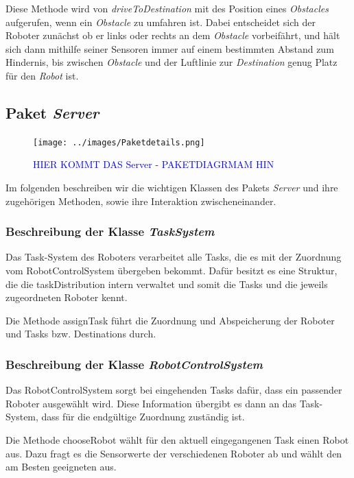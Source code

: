 			Diese Methode wird von \textit{driveToDestination} mit des Position eines \textit{Obstacles} aufgerufen, 
			wenn ein \textit{Obstacle} zu umfahren ist.
			Dabei entscheidet sich der Roboter zunächst ob er links oder rechts an dem \textit{Obstacle} vorbeifährt, 
			und hält sich dann mithilfe seiner Sensoren immer auf einem bestimmten Abstand zum Hindernis, bis zwischen 
			\textit{Obstacle} und der Luftlinie zur \textit{Destination} genug Platz für den \textit{Robot} ist.
	
\subsection{Paket \textit{Server}}
\begin{figure}[H]
	\centering
	\texttt{[image: ../images/Paketdetails.png]}
	\caption{\textcolor{blue}{HIER KOMMT DAS Server - PAKETDIAGRMAM HIN}}
	\label{Paketdetails}
	\end{figure}
	Im folgenden beschreiben wir die wichtigen Klassen des Pakets \textit{Server} 
	und ihre zugehörigen Methoden, sowie ihre Interaktion zwischeneinander. 


	\subsubsection{Beschreibung der Klasse \textit{TaskSystem}}
		Das Task-System des Roboters verarbeitet alle Tasks, die es mit der Zuordnung vom RobotControlSystem übergeben bekommt. Dafür besitzt es eine Struktur, die die taskDistribution intern verwaltet und somit die Tasks und die jeweils zugeordneten Roboter kennt.
		
			Die Methode assignTask führt die Zuordnung und Abspeicherung der Roboter und Tasks bzw. Destinations durch.
			
	\subsubsection{Beschreibung der Klasse \textit{RobotControlSystem}}
		Das RobotControlSystem sorgt bei eingehenden Tasks dafür, dass ein passender Roboter ausgewählt wird. Diese Information übergibt es dann an das Task-System, dass für die endgültige Zuordnung zuständig ist.
	
			Die Methode chooseRobot wählt für den aktuell eingegangenen Task einen Robot aus. Dazu fragt es die Sensorwerte der verschiedenen Roboter ab und wählt den am Besten geeigneten aus.